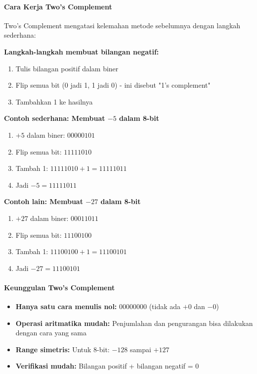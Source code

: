 \documentclass[../main.tex]{subfiles}
\begin{document}
\paragraph{Cara Kerja Two's Complement}
Two's Complement mengatasi kelemahan metode sebelumnya dengan langkah sederhana:

\textbf{Langkah-langkah membuat bilangan negatif:}
\begin{enumerate}
    \item Tulis bilangan positif dalam biner
    \item Flip semua bit (0 jadi 1, 1 jadi 0) - ini disebut "1's complement"
    \item Tambahkan 1 ke hasilnya
\end{enumerate}

\textbf{Contoh sederhana: Membuat \(-5\) dalam 8-bit}
\begin{enumerate}
    \item \(+5\) dalam biner: \(00000101\)
    \item Flip semua bit: \(11111010\)
    \item Tambah 1: \(11111010 + 1 = 11111011\)
    \item Jadi \(-5 = 11111011\)
\end{enumerate}

\textbf{Contoh lain: Membuat \(-27\) dalam 8-bit}
\begin{enumerate}
    \item \(+27\) dalam biner: \(00011011\)
    \item Flip semua bit: \(11100100\)
    \item Tambah 1: \(11100100 + 1 = 11100101\)
    \item Jadi \(-27 = 11100101\)
\end{enumerate}

\paragraph{Keunggulan Two's Complement}
\begin{itemize}
    \item \textbf{Hanya satu cara menulis nol:} \(00000000\) (tidak ada \(+0\) dan \(-0\))
    \item \textbf{Operasi aritmatika mudah:} Penjumlahan dan pengurangan bisa dilakukan dengan cara yang sama
    \item \textbf{Range simetris:} Untuk 8-bit: \(-128\) sampai \(+127\)
    \item \textbf{Verifikasi mudah:} Bilangan positif + bilangan negatif = 0
\end{itemize}
\end{document}
